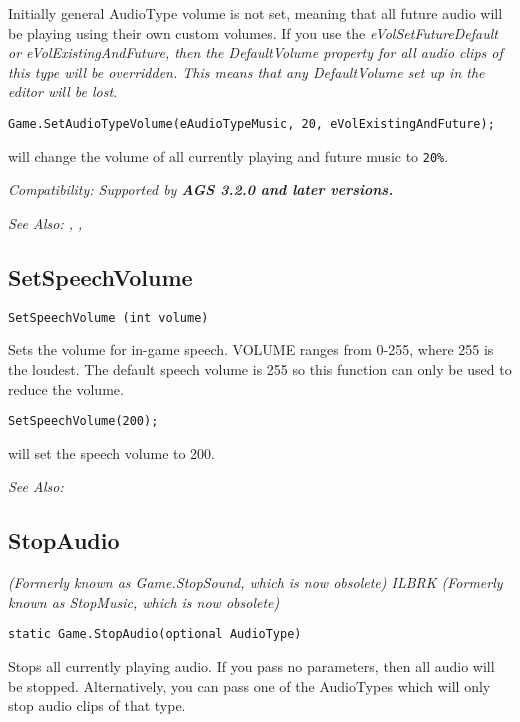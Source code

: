 Initially general AudioType volume is not set, meaning that all future audio will be
playing using their own custom volumes.
If you use the \it{eVolSetFutureDefault} or \it{eVolExistingAndFuture}, then
the DefaultVolume property for all audio clips of this type will be overridden.
This means that any DefaultVolume set up in the editor will be lost.

\begin{verbatim}
Game.SetAudioTypeVolume(eAudioTypeMusic, 20, eVolExistingAndFuture);
\end{verbatim}
will change the volume of all currently playing and future music to \verb$20%$.

\it{Compatibility:} Supported by \bf{AGS 3.2.0} and later versions.

\it{See Also:} , ,


\subsection{SetSpeechVolume}\label{SetSpeechVolume}%

\begin{verbatim}
SetSpeechVolume (int volume)
\end{verbatim}
Sets the volume for in-game speech. VOLUME ranges from 0-255, where 255 is
the loudest. The default speech volume is 255 so this function can only
be used to reduce the volume.

\begin{verbatim}
SetSpeechVolume(200);
\end{verbatim}
will set the speech volume to 200.

\it{See Also:} 


\subsection{StopAudio}\label{Game.StopAudio}%

\it{(Formerly known as Game.StopSound, which is now obsolete)} ILBRK
\it{(Formerly known as StopMusic, which is now obsolete)}

\begin{verbatim}
static Game.StopAudio(optional AudioType)
\end{verbatim}
Stops all currently playing audio. If you pass no parameters, then all audio will be stopped.
Alternatively, you can pass one of the AudioTypes which will only stop audio clips of that
type.

